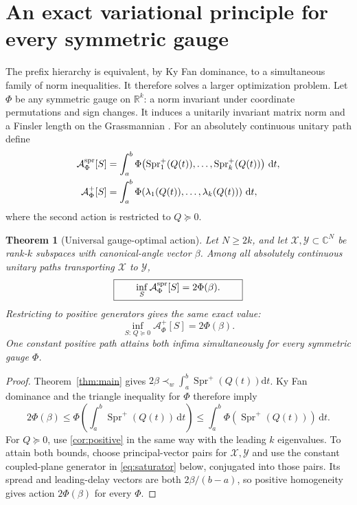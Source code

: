 \documentclass[11pt]{article}
\newtheorem{theorem}{Theorem}[section]
\theoremstyle{definition}
\theoremstyle{remark}
\newcommand{\C}{\mathbb C}
\newcommand{\dd}{\mathrm d}
\newcommand{\Spr}{\operatorname{Spr}^{+}}
\begin{document}
\section{An exact variational principle for every symmetric gauge}

The prefix hierarchy is equivalent, by Ky Fan dominance, to a simultaneous
family of norm inequalities.  It therefore solves a larger optimization
problem.  Let $\Phi$ be any symmetric gauge on $\mathbb R^k$: a norm invariant
under coordinate permutations and sign changes.  It induces a unitarily
invariant matrix norm and a Finsler length on the Grassmannian
\cite{QiuZhangLi2005}.  For an absolutely continuous unitary path define
\begin{align}
 \mathcal A_\Phi^{\rm spr}[S]
 &=\int_a^b\Phi\!\left(\Spr_1(Q(t)),\ldots,\Spr_k(Q(t))\right)\,\dd t,
 \label{eq:gaugeactionspread}\\
 \mathcal A_\Phi^{+}[S]
 &=\int_a^b\Phi\!\left(\lambda_1(Q(t)),\ldots,\lambda_k(Q(t))\right)\,\dd t,
 \label{eq:gaugeactionpositive}
\end{align}
where the second action is restricted to $Q\succeq0$.

\begin{theorem}[Universal gauge-optimal action]\label{thm:gaugeoptimal}
Let $N\geq2k$, and let $\mathcal X,\mathcal Y\subset\C^N$ be rank-$k$
subspaces with canonical-angle vector $\beta$.  Among all absolutely
continuous unitary paths transporting $\mathcal X$ to $\mathcal Y$,
\begin{equation}\label{eq:gaugeinfimum}
 \boxed{\qquad
 \inf_S\mathcal A_\Phi^{\rm spr}[S]=2\Phi(\beta).
 \qquad}
\end{equation}
Restricting to positive generators gives the same exact value:
\begin{equation}\label{eq:gaugeinfimumpositive}
 \boxed{\qquad
 \inf_{S:\,Q\succeq0}\mathcal A_\Phi^{+}[S]=2\Phi(\beta).
 \qquad}
\end{equation}
One constant positive path attains both infima simultaneously for every
symmetric gauge $\Phi$.
\end{theorem}

\begin{proof}
Theorem~\ref{thm:main} gives
$2\beta\prec_w\int_a^b\Spr(Q(t))\dd t$.  Ky Fan dominance and the triangle
inequality for $\Phi$ therefore imply
\[
 2\Phi(\beta)
 \leq\Phi\!\left(\int_a^b\Spr(Q(t))\,\dd t\right)
 \leq\int_a^b\Phi(\Spr(Q(t)))\,\dd t.
\]
For $Q\succeq0$, use \cref{cor:positive} in the same way with the leading
$k$ eigenvalues.  To attain both bounds, choose principal-vector pairs for
$\mathcal X,\mathcal Y$ and use the constant coupled-plane generator in
\eqref{eq:saturator} below, conjugated into those pairs.  Its spread and
leading-delay vectors are both $2\beta/(b-a)$, so positive homogeneity gives
action $2\Phi(\beta)$ for every $\Phi$.
\end{proof}
\end{document}
